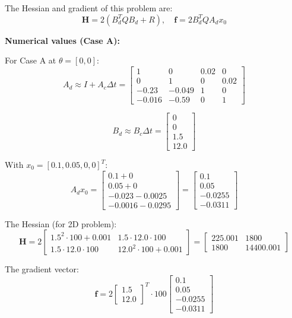 The Hessian and gradient of this problem are:
\[
\mathbf{H} = 2(B_d^T Q B_d + R), \quad \mathbf{f} = 2 B_d^T Q A_d x_0
\]

\textbf{Numerical values (Case A):}

For Case A at $\theta = [0, 0]$:
\[
A_d \approx I + A_c \Delta t = \begin{bmatrix} 1 & 0 & 0.02 & 0 \\ 0 & 1 & 0 & 0.02 \\ -0.23 & -0.049 & 1 & 0 \\ -0.016 & -0.59 & 0 & 1 \end{bmatrix}
\]

\[
B_d \approx B_c \Delta t = \begin{bmatrix} 0 \\ 0 \\ 1.5 \\ 12.0 \end{bmatrix}
\]

With $x_0 = [0.1, 0.05, 0, 0]^T$:
\[
A_d x_0 = \begin{bmatrix} 0.1 + 0 \\ 0.05 + 0 \\ -0.023 - 0.0025 \\ -0.0016 - 0.0295 \end{bmatrix} = \begin{bmatrix} 0.1 \\ 0.05 \\ -0.0255 \\ -0.0311 \end{bmatrix}
\]

The Hessian (for 2D problem):
\[
\mathbf{H} = 2 \begin{bmatrix} 1.5^2 \cdot 100 + 0.001 & 1.5 \cdot 12.0 \cdot 100 \\ 1.5 \cdot 12.0 \cdot 100 & 12.0^2 \cdot 100 + 0.001 \end{bmatrix} = \begin{bmatrix} 225.001 & 1800 \\ 1800 & 14400.001 \end{bmatrix}
\]

The gradient vector:
\[
\mathbf{f} = 2 \begin{bmatrix} 1.5 \\ 12.0 \end{bmatrix}^T \cdot 100 \begin{bmatrix} 0.1 \\ 0.05 \\ -0.0255 \\ -0.0311 \end{bmatrix}
\]

